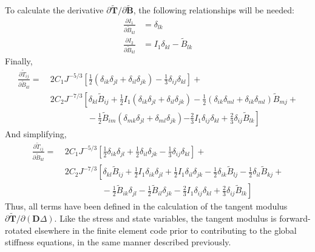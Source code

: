 To calculate the derivative $\partial \tilde{\bm T}/\partial {\tilde{\bm {B}}}$, the following relationships will be needed:
\begin{align}
\frac{\partial I_1}{\partial \tilde{B}_{kl}} &= \delta_{lk}  \\
\frac{\partial I_2}{\partial \tilde{B}_{kl}} &= I_1\delta_{kl} - \tilde{B}_{lk}
\end{align}
Finally,
\begin{equation}
\begin{aligned}
\frac{\partial \tilde{T}_{ij}}{\partial \tilde{B}_{kl}} = &\ 2C_1J^{-5/3}\left[\frac{1}{2}\left(\delta_{ik}\delta_{jl} + \delta_{il}\delta_{jk}\right) - \frac{1}{3}\delta_{ij}\delta_{kl}\right] + \\
&\ 2C_2J^{-7/3}\left[\delta_{kl}\tilde{B}_{ij} + \frac{1}{2}I_1\left(\delta_{ik}\delta_{jl} + \delta_{il}\delta_{jk}\right) -\frac{1}{2}\left(\delta_{ik}\delta_{ml} + \delta_{ik}\delta_{ml}\right)\tilde{B}_{mj} \right. + \\
&\phantom{xxxxxxxx}-\frac{1}{2}\tilde{B}_{im}\left(\delta_{mk}\delta_{jl} +\delta_{ml}\delta_{jk}\right) 
\left.- \frac{2}{3}I_1\delta_{ij}\delta_{kl} + \frac{2}{3}\delta_{ij}\tilde{B}_{lk}\right]
\end{aligned}
\end{equation}
And simplifying,
\begin{equation}
\begin{aligned}
\frac{\partial \tilde{T}_{ij}}{\partial \tilde{B}_{kl}} = &\ 2C_1J^{-5/3}\left[\frac{1}{2}\delta_{ik}\delta_{jl} + \frac{1}{2}\delta_{il}\delta_{jk} - \frac{1}{3}\delta_{ij}\delta_{kl}\right] + \\
&\ 2C_2J^{-7/3}\left[\delta_{kl}\tilde{B}_{ij} + \frac{1}{2}I_1\delta_{ik}\delta_{jl} + \frac{1}{2}I_1\delta_{il}\delta_{jk} -\frac{1}{2}\delta_{ik}\tilde{B}_{lj} -\frac{1}{2}\delta_{il}\tilde{B}_{kj} \right. + \\
&\left.\phantom{xxxxxxxx}-\frac{1}{2}\tilde{B}_{ik}\delta_{jl} -\frac{1}{2}\tilde{B}_{il}\delta_{jk} - \frac{2}{3}I_1\delta_{ij}\delta_{kl} + \frac{2}{3}\delta_{ij}\tilde{B}_{lk}\right]
\end{aligned}
\end{equation}
Thus, all terms have been defined in the calculation of the tangent modulus $\partial{\tilde{\bm{T}}}/\partial({\bm{D}\Delta})$. Like the stress and state variables, the tangent modulus is forward-rotated elsewhere in the finite element code prior to contributing to the global stiffness equations, in the same manner described previously.

